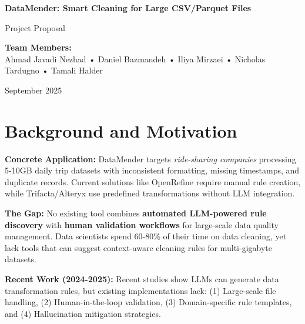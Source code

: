 \documentclass[11pt]{article}
\begin{document}
\begin{center}
    {\Huge\color{primaryblue}\textbf{DataMender: Smart Cleaning for Large CSV/Parquet Files}}
    
    \vspace{0.3cm}
    {\Large\color{darkgray}Project Proposal}
    
    \vspace{0.5cm}
    
    \vspace{0.5cm}
    {\color{darkgray}\textbf{Team Members:}} \\
    Ahmad Javadi Nezhad • Daniel Bazmandeh • Iliya Mirzaei • Nicholas Tardugno • Tamali Halder
    
    \vspace{0.3cm}
    {\color{darkgray}September 2025}
\end{center}

\vspace{0.5cm}

\section{\color{primaryblue}Background and Motivation}

\textbf{Concrete Application:} DataMender targets \textit{ride-sharing companies} processing 5-10GB daily trip datasets with inconsistent formatting, missing timestamps, and duplicate records. Current solutions like OpenRefine require manual rule creation, while Trifacta/Alteryx use predefined transformations without LLM integration.

\textbf{The Gap:} No existing tool combines \textbf{automated LLM-powered rule discovery} with \textbf{human validation workflows} for large-scale data quality management. Data scientists spend 60-80\% of their time on data cleaning, yet lack tools that can suggest context-aware cleaning rules for multi-gigabyte datasets.

\textbf{Recent Work (2024-2025):} Recent studies show LLMs can generate data transformation rules, but existing implementations lack: (1) Large-scale file handling, (2) Human-in-the-loop validation, (3) Domain-specific rule templates, and (4) Hallucination mitigation strategies.
\end{document}

